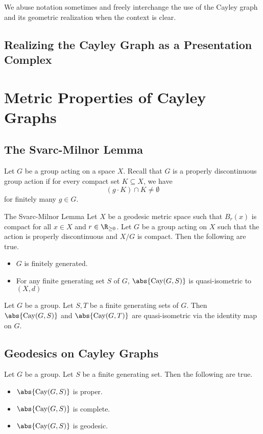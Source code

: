 \documentclass[a4paper]{article}
\begin{document}
We abuse notation sometimes and freely interchange the use of the Cayley graph and its geometric realization when the context is clear. 

\subsection{Realizing the Cayley Graph as a Presentation Complex}

\pagebreak
\section{Metric Properties of Cayley Graphs}
\subsection{The Svarc-Milnor Lemma}
Let $G$ be a group acting on a space $X$. Recall that $G$ is a properly discontinuous group action if for every compact set $K\subseteq X$, we have $$(g\cdot K)\cap K\neq\emptyset$$ for finitely many $g\in G$. 

\begin{thm}{The Svarc-Milnor Lemma}{} Let $X$ be a geodesic metric space such that $B_r(x)$ is compact for all $x\in X$ and $r\in\R_{\geq 0}$. Let $G$ be a group acting on $X$ such that the action is properly discontinuous and $X/G$ is compact. Then the following are true. 
\begin{itemize}
\item $G$ is finitely generated. 
\item For any finite generating set $S$ of $G$, $\abs{\text{Cay}(G,S)}$ is quasi-isometric to $(X,d)$
\end{itemize}
\end{thm}

\begin{prp}{}{} Let $G$ be a group. Let $S,T$ be a finite generating sets of $G$. Then $\abs{\text{Cay}(G,S)}$ and $\abs{\text{Cay}(G,T)}$ are quasi-isometric via the identity map on $G$. 
\end{prp}

\subsection{Geodesics on Cayley Graphs}
\begin{prp}{}{} Let $G$ be a group. Let $S$ be a finite generating set. Then the following are true. 
\begin{itemize}
\item $\abs{\text{Cay}(G,S)}$ is proper. 
\item $\abs{\text{Cay}(G,S)}$ is complete. 
\item $\abs{\text{Cay}(G,S)}$ is geodesic. 
\end{itemize}
\end{prp}
\end{document}
